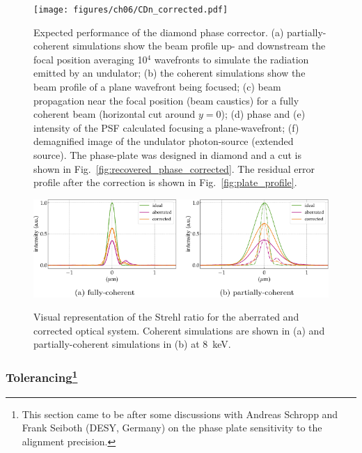 \begin{refsection}
\begin{figure}[h]
        \centering
        {\texttt{[image: figures/ch06/CDn\_corrected.pdf]}}
        \caption[Expected performance of the diamond phase corrector]{Expected performance of the diamond phase corrector. (a) partially-coherent simulations show the beam profile up- and downstream the focal position averaging 10$^{4}$ wavefronts to simulate the radiation emitted by an undulator; (b) the coherent simulations show the beam profile of a plane wavefront being focused; (c) beam propagation near the focal position (beam caustics) for a fully coherent beam (horizontal cut around $y=0$); (d) phase and (e) intensity of the PSF calculated focusing a plane-wavefront; (f) demagnified image of the undulator photon-source (extended source). The phase-plate was designed in diamond and a cut is shown in Fig.~\ref{fig:recovered_phase_corrected}. The residual error profile after the correction is shown in Fig.~\ref{fig:plate_profile}.}\label{fig:CDn_corrected}
\end{figure}

\begin{figure}[h]
        \centering
        {\includegraphics[width=0.7\linewidth]{figures/ch06/Strehl_correction.pdf}}
        \caption[Strehl ratio for the corrected system]{Visual representation of the Strehl ratio for the aberrated and corrected optical system. Coherent simulations are shown in (a) and partially-coherent simulations in (b) at 8~keV.}\label{fig:Strehl_correction}
\end{figure}

\subsubsection*{Tolerancing\footnote{This section came to be after some discussions with Andreas Schropp and Frank Seiboth (DESY, Germany) on the phase plate sensitivity to the alignment precision.}}


\end{refsection}

